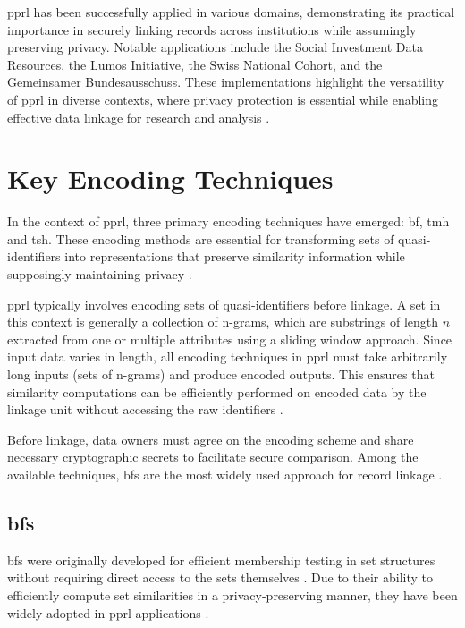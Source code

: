 \ac{pprl} has been successfully applied in various domains, demonstrating its practical importance in securely linking records across institutions while assumingly preserving privacy.
Notable applications include the Social Investment Data Resources, the Lumos Initiative, the Swiss National Cohort, and the Gemeinsamer Bundesausschuss.
These implementations highlight the versatility of \ac{pprl} in diverse contexts, where privacy protection is essential while enabling effective data linkage for research and analysis \cite{schaefer2024}.



\section{Key Encoding Techniques} \label{sec:key-encodings}

In the context of \ac{pprl}, three primary encoding techniques have emerged: \ac{bf}, \ac{tmh} and \ac{tsh}.
These encoding methods are essential for transforming sets of quasi-identifiers into representations that preserve similarity information while supposingly maintaining privacy \cite{schaefer2024,vidanage2020graph, schnell2009privacy}.

\ac{pprl} typically involves encoding sets of quasi-identifiers before linkage.
A set in this context is generally a collection of n-grams, which are substrings of length $n$ extracted from one or multiple attributes using a sliding window approach.
Since input data varies in length, all encoding techniques in \ac{pprl} must take arbitrarily long inputs (sets of n-grams) and produce encoded outputs.
This ensures that similarity computations can be efficiently performed on encoded data by the linkage unit without accessing the raw identifiers \cite{vidanage2020graph,schaefer2024}.

Before linkage, data owners must agree on the encoding scheme and share necessary cryptographic secrets to facilitate secure comparison.
Among the available techniques, \ac{bf}s are the most widely used approach for record linkage \cite{schaefer2024}.

\subsection{\ac{bf}s} \label{sec:bf}

\ac{bf}s were originally developed for efficient membership testing in set structures without requiring direct access to the sets themselves \cite{bloom1970space}.
Due to their ability to efficiently compute set similarities in a privacy-preserving manner, they have been widely adopted in \ac{pprl} applications \cite{schaefer2024,vidanage2020graph,schnell2009privacy}.

